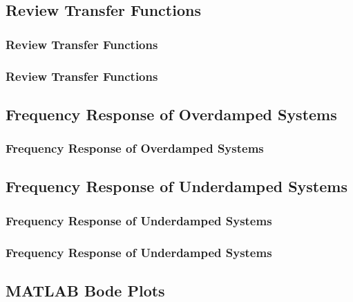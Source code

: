 \documentclass[fleqn]{beamer} %
\newcommand{\sectionIIIsubsectionItitle}{Review Transfer Functions}
\newcommand{\sectionIIIsubsectionIItitle}{Frequency Response of Overdamped Systems}
\newcommand{\sectionIIIsubsectionIIItitle}{Frequency Response of Underdamped Systems}
\newcommand{\sectionIIIsubsectionIVtitle}{MATLAB Bode Plots}
\begin{document}
		\subsection{\sectionIIIsubsectionItitle}\label{sectionIIIsubsectionI}

			\begin{frame}
				\frametitle{\sectionIIIsubsectionItitle}
				\bigskip


				\btVFill
			\end{frame}

			\begin{frame}
				\frametitle{\sectionIIIsubsectionItitle}
				\bigskip
				

				\btVFill
			\end{frame}

		\subsection{\sectionIIIsubsectionIItitle}\label{sectionIIIsubsectionII}	

			\begin{frame}
				\frametitle{\sectionIIIsubsectionIItitle}
				\bigskip

	
				\btVFill
			\end{frame}

		\subsection{\sectionIIIsubsectionIIItitle}\label{sectionIIIsubsectionIII}

			\begin{frame}
				\frametitle{\sectionIIIsubsectionIIItitle}
				\bigskip

		
			
				\btVFill
			\end{frame}

			\begin{frame}
				\frametitle{\sectionIIIsubsectionIIItitle}
				\bigskip

			
				\btVFill
			\end{frame}

		\subsection{\sectionIIIsubsectionIVtitle}\label{sectionIIIsubsectionIV}	
\end{document}
